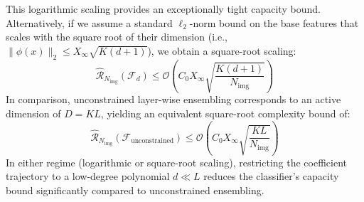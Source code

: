 This logarithmic scaling provides an exceptionally tight capacity bound. Alternatively, if we assume a standard $\ell_2$-norm bound on the base features that scales with the square root of their dimension (i.e., $\|\phi(x)\|_2 \le X_\infty \sqrt{K(d+1)}$), we obtain a square-root scaling:
\begin{equation}
\label{eq:generalization_bound_dimension_sqrt}
\widehat{\mathcal{R}}_{N_{\text{img}}}(\mathcal{F}_d) \le \mathcal{O}\left( C_0 X_\infty \sqrt{\frac{K (d + 1)}{N_{\text{img}}}} \right)
\end{equation}
In comparison, unconstrained layer-wise ensembling corresponds to an active dimension of $D = K L$, yielding an equivalent square-root complexity bound of:
\begin{equation}
\widehat{\mathcal{R}}_{N_{\text{img}}}(\mathcal{F}_{\text{unconstrained}}) \le \mathcal{O}\left( C_0 X_\infty \sqrt{\frac{K L}{N_{\text{img}}}} \right)
\end{equation}
In either regime (logarithmic or square-root scaling), restricting the coefficient trajectory to a low-degree polynomial $d \ll L$ reduces the classifier's capacity bound significantly compared to unconstrained ensembling.

